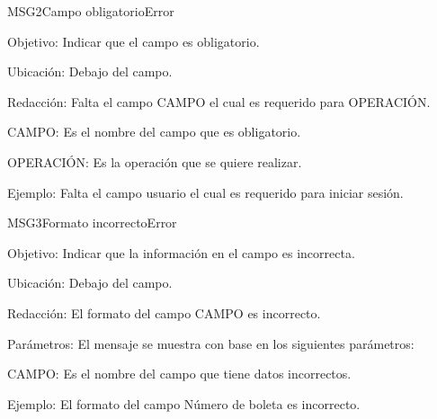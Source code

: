 
\begin{mensaje}{MSG2}{Campo obligatorio}{Error}
	\item[Objetivo:] Indicar que el campo es obligatorio.
	\item[Ubicación:] Debajo del campo.
	\item[Redacción:] Falta el campo CAMPO el cual es requerido para OPERACIÓN.
	\begin{Citemize}
		\item CAMPO: Es el nombre del campo que es obligatorio.
		\item OPERACIÓN: Es la operación que se quiere realizar.
	\end{Citemize}
	\item[Ejemplo:] Falta el campo usuario el cual es requerido para iniciar sesión.
\end{mensaje}

\begin{mensaje}{MSG3}{Formato incorrecto}{Error}
	\item[Objetivo:] Indicar que la información en el campo es incorrecta.
    \item[Ubicación:] Debajo del campo.
    	\item[Redacción:] El formato del campo CAMPO es incorrecto.
	\item[Parámetros:] El mensaje se muestra con base en los siguientes parámetros:
	\begin{Citemize}
		\item CAMPO: Es el nombre del campo que tiene datos incorrectos.
	\end{Citemize}
	\item[Ejemplo:] El formato del campo Número de boleta es incorrecto.
\end{mensaje}

